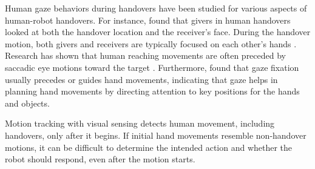 Human gaze behaviors during handovers have been studied for various aspects of human-robot handovers. For instance, \cite{shared_attention_gaze_hanover_timing_2014} found that givers in human handovers looked at both the handover location and the receiver’s face. During the handover motion, both givers and receivers are typically focused on each other’s hands \cite{robot_gaze_behav_in_h2r_handovers_kshirsagar}. Research has shown that human reaching movements are often preceded by saccadic eye motions toward the target \cite{gaze_vs_hand_moving_target}. Furthermore, \cite{eye_hand_coordination_2001} found that gaze fixation usually precedes or guides hand movements, indicating that gaze helps in planning hand movements by directing attention to key positions for the hands and objects.

Motion tracking with visual sensing detects human movement, including handovers, only after it begins. If initial hand movements resemble non-handover motions, it can be difficult to determine the intended action and whether the robot should respond, even after the motion starts.
